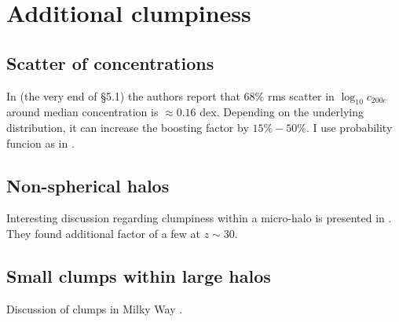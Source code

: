 
\section{Additional clumpiness}
\subsection{Scatter of concentrations}
In \cite{2014arXiv1407.4730D} (the very end of \S5.1) the authors report that 68\% rms scatter in $\log_{10}c_{200c}$ around median concentration is $\approx 0.16$ dex. Depending on the underlying distribution, it can increase the boosting factor by $15\%-50\%$. I use probability funcion as in \cite{2014arXiv1412.4308M}.

\subsection{Non-spherical halos}
Interesting discussion regarding clumpiness within a micro-halo is presented in \citet{Anderhalden_2013}. They found additional factor of a few at $z \sim 30$.

\subsection{Small clumps within large halos}
Discussion of clumps in Milky Way \cite{Belotsky_2014}.